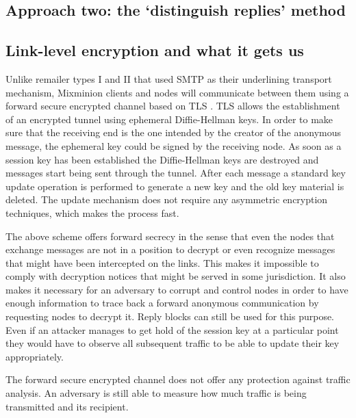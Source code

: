 \documentclass{llncs}
\begin{document}
\subsection{Approach two: the `distinguish replies' method}


\subsection{Link-level encryption and what it gets us}

Unlike remailer types I and II that used SMTP as their underlining 
transport mechanism, Mixminion clients and nodes will communicate between 
them using a forward secure encrypted channel based on TLS \cite{TLS}.
TLS allows the establishment of an encrypted tunnel using ephemeral 
Diffie-Hellman keys. In order to make sure that the receiving end is the 
one intended by the creator of the anonymous message, the ephemeral key could be 
signed by the receiving node. As soon as a session key has been established 
the Diffie-Hellman keys are destroyed and messages start being sent through the
tunnel. After each message a standard key update operation is performed to generate 
a new key and the old key material is deleted. The update mechanism does not require 
any asymmetric encryption techniques, which makes the process fast.

The above scheme offers forward secrecy in the sense that even the nodes 
that exchange messages are not in a position to decrypt or even recognize 
messages that might have been intercepted on the links. This makes it impossible 
to comply with decryption notices that might be served in some jurisdiction.
It also makes it necessary for an adversary to corrupt and control nodes in order
to have enough information to trace back a forward anonymous communication by 
requesting nodes to decrypt it. Reply blocks can still be used for this purpose.
Even if an attacker manages to get hold of the session key at a particular point
they would have to observe all subsequent traffic to be able to update their key
appropriately. 

The forward secure encrypted channel does not offer any protection against 
traffic analysis. An adversary is still able to measure how much traffic is 
being transmitted and its recipient.


\end{document}
